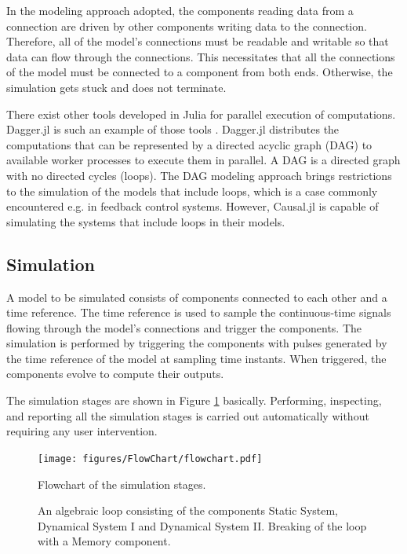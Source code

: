\documentclass{juliacon}
\begin{document}
In the modeling approach adopted, the components reading data from a connection are driven by other components writing data to the connection. Therefore, all of the model's connections must be readable and writable so that data can flow through the connections. This necessitates that all the connections of the model must be connected to a component from both ends. Otherwise, the simulation gets stuck and does not terminate.

There exist other tools developed in Julia for parallel execution of computations. Dagger.jl is such an example of those tools \cite{dagger}. Dagger.jl distributes the computations that can be represented by a directed acyclic graph (DAG) to available worker processes to execute them in parallel. A DAG is a directed graph with no directed cycles (loops). The DAG modeling approach brings restrictions to the simulation of the models that include loops, which is a case commonly encountered e.g. in feedback control systems. However, Causal.jl is capable of simulating the systems that include loops in their models. 


\subsection{Simulation}
A model to be simulated consists of components connected to each other and a time reference. The time reference is used to sample the continuous-time signals flowing through the model's connections and trigger the components. The simulation is performed by triggering the components with pulses generated by the time reference of the model at sampling time instants. When triggered, the components evolve to compute their outputs.

The simulation stages are shown in Figure \ref{fig: flowchart} basically. Performing, inspecting, and reporting all the simulation stages is carried out automatically without requiring any user intervention.

\begin{figure}
    \centering
    \texttt{[image: figures/FlowChart/flowchart.pdf]}
    \caption{Flowchart of the simulation stages.}
    \label{fig: flowchart}
\end{figure}

\begin{figure}
    \centering
    \caption{\protect{} An algebraic loop consisting of the components Static System, Dynamical System I and Dynamical System II. \protect{} Breaking of the loop with a Memory component. }
    \label{fig: algebraic loop}
\end{figure}
\end{document}
